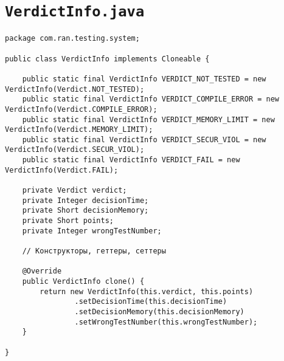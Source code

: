 \section*{\texttt{VerdictInfo.java}}
\begin{verbatim}
package com.ran.testing.system;

public class VerdictInfo implements Cloneable {

    public static final VerdictInfo VERDICT_NOT_TESTED = new VerdictInfo(Verdict.NOT_TESTED);
    public static final VerdictInfo VERDICT_COMPILE_ERROR = new VerdictInfo(Verdict.COMPILE_ERROR);
    public static final VerdictInfo VERDICT_MEMORY_LIMIT = new VerdictInfo(Verdict.MEMORY_LIMIT);
    public static final VerdictInfo VERDICT_SECUR_VIOL = new VerdictInfo(Verdict.SECUR_VIOL);
    public static final VerdictInfo VERDICT_FAIL = new VerdictInfo(Verdict.FAIL);

    private Verdict verdict;
    private Integer decisionTime;
    private Short decisionMemory;
    private Short points;
    private Integer wrongTestNumber;

    // Конструкторы, геттеры, сеттеры

    @Override
    public VerdictInfo clone() {
        return new VerdictInfo(this.verdict, this.points)
                .setDecisionTime(this.decisionTime)
                .setDecisionMemory(this.decisionMemory)
                .setWrongTestNumber(this.wrongTestNumber);
    }

}
\end{verbatim}

